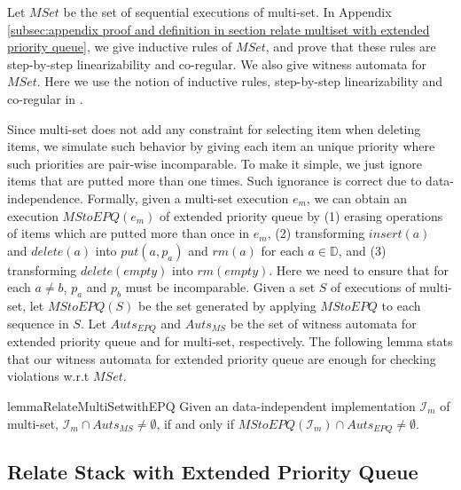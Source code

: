 Let $\textit{MSet}$ be the set of sequential executions of multi-set. In Appendix \ref{subsec:appendix proof and definition in section relate multiset with extended priority queue}, we give inductive rules of $\textit{MSet}$, and prove that these rules are step-by-step linearizability and co-regular. We also give witness automata for $\textit{MSet}$. Here we use the notion of inductive rules, step-by-step linearizability and co-regular in \cite{Bouajjani:2015}.

Since multi-set does not add any constraint for selecting item when deleting items, we simulate such behavior by giving each item an unique priority where such priorities are pair-wise incomparable. To make it simple, we just ignore items that are putted more than one times. Such ignorance is correct due to data-independence. Formally, given a multi-set execution $e_m$, we can obtain an execution $\textit{MStoEPQ}(e_m)$ of extended priority queue by (1) erasing operations of items which are putted more than once in $e_m$, (2) transforming $\textit{insert}(a)$ and $\textit{delete}(a)$ into $\textit{put}(a,p_a)$ and $\textit{rm}(a)$ for each $a \in \mathbb{D}$, and (3) transforming $\textit{delete}(\textit{empty})$ into $\textit{rm}(\textit{empty})$. Here we need to ensure that for each $a \neq b$, $p_a$ and $p_b$ must be incomparable. Given a set $S$ of executions of multi-set, let $\textit{MStoEPQ}(S)$ be the set generated by applying $\textit{MStoEPQ}$ to each sequence in $S$. Let $\textit{Auts}_{\textit{EPQ}}$ and $\textit{Auts}_{\textit{MS}}$ be the set of witness automata for extended priority queue and for multi-set, respectively. The following lemma stats that our witness automata for extended priority queue are enough for checking violations w.r.t $\textit{MSet}$.

\begin{restatable}{lemma}{RelateMultiSetwithEPQ}
\label{lemma:relate multi set with extended priority queue}
Given an data-independent implementation $\mathcal{I}_m$ of multi-set, $\mathcal{I}_m \cap \textit{Auts}_{\textit{MS}} \neq \emptyset$, if and only if $\textit{MStoEPQ}(\mathcal{I}_m) \cap \textit{Auts}_{\textit{EPQ}} \neq \emptyset$.
\end{restatable}


\subsection{Relate Stack with Extended Priority Queue}
\label{subsec:relate stack with extended priority queue}

